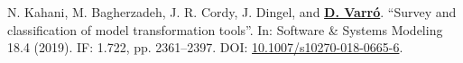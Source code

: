 {\begin{yearlist}
\item[\cite{sosym2019-mt}]
N. Kahani, M. Bagherzadeh, J. R. Cordy, J. Dingel, and \underline{\textbf{D. Varró}}. “Survey and classification of model transformation tools”. In: Software \& Systems Modeling 18.4 (2019). IF: 1.722, pp. 2361–2397. 
\newline DOI: \href{https://doi.org/10.1007/s10270-018-0665-6}{10.1007/s10270-018-0665-6}.

\end{yearlist}
}
